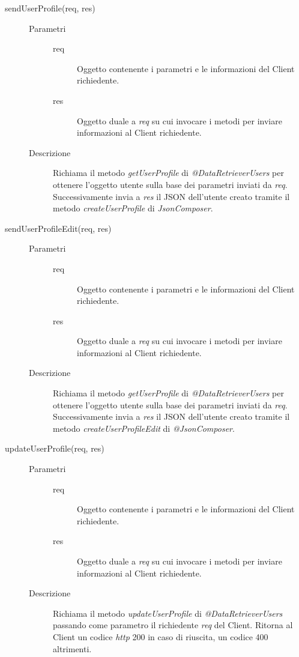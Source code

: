 \begin{description}
\begin{description}
    \item[sendUserProfile(req, res)] \hfill
      \begin{description}
	\item[Parametri] \hfill
	  \begin{description}
	    \item[req]
	    Oggetto contenente i parametri e le informazioni del Client richiedente.
	    \item[res]
	    Oggetto duale a \textit{req} su cui invocare i metodi per inviare informazioni al Client richiedente.
	  \end{description}
	\item[Descrizione]
	Richiama il metodo \textit{getUserProfile} di \textit{@DataRetrieverUsers} per ottenere l'oggetto utente 
	sulla base dei parametri inviati da \textit{req}. Successivamente invia a \textit{res} il JSON dell'utente 
	creato tramite il metodo \textit{createUserProfile} di \textit{JsonComposer}.
      \end{description}
      
    \item[sendUserProfileEdit(req, res)] \hfill
      \begin{description}
	\item[Parametri] \hfill
	  \begin{description}
	    \item[req]
	    Oggetto contenente i parametri e le informazioni del Client richiedente.
	    \item[res]
	    Oggetto duale a \textit{req} su cui invocare i metodi per inviare informazioni al Client richiedente.
	  \end{description}
	\item[Descrizione]
	Richiama il metodo \textit{getUserProfile} di \textit{@DataRetrieverUsers} per ottenere l'oggetto utente 
	sulla base dei parametri inviati da \textit{req}. Successivamente invia a \textit{res} il JSON dell'utente 
	creato tramite il metodo \textit{createUserProfileEdit} di \textit{@JsonComposer}.
      \end{description}
      
    \item[updateUserProfile(req, res)] \hfill
      \begin{description}
	\item[Parametri] \hfill
	  \begin{description}
	    \item[req]
	    Oggetto contenente i parametri e le informazioni del Client richiedente.
	    \item[res]
	    Oggetto duale a \textit{req} su cui invocare i metodi per inviare informazioni al Client richiedente.
	  \end{description}
	\item[Descrizione]
	Richiama il metodo \textit{updateUserProfile} di \textit{@DataRetrieverUsers} passando come parametro 
	il richiedente \textit{req} del Client. Ritorna al Client un codice \textit{http} 200 in caso di riuscita, un codice 400 altrimenti.
      \end{description}
      

\end{description}
\end{description}
